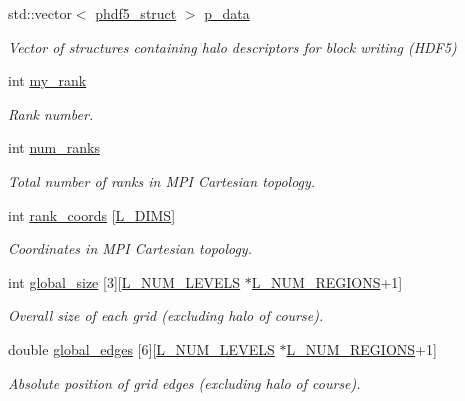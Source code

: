 \begin{DoxyCompactItemize}
std\+::vector$<$ \hyperlink{struct_mpi_manager_1_1phdf5__struct}{phdf5\+\_\+struct} $>$ \hyperlink{class_mpi_manager_a03972530e718d5b0a7f119e9c6132179}{p\+\_\+data}
\begin{DoxyCompactList}\small\item\em Vector of structures containing halo descriptors for block writing (H\+D\+F5) \end{DoxyCompactList}\item 
int \hyperlink{class_mpi_manager_a8329212abc23e5fa3e32e961b7823b5b}{my\+\_\+rank}
\begin{DoxyCompactList}\small\item\em Rank number. \end{DoxyCompactList}\item 
int \hyperlink{class_mpi_manager_af5156a5e4519f43230b6b84792464e48}{num\+\_\+ranks}
\begin{DoxyCompactList}\small\item\em Total number of ranks in M\+PI Cartesian topology. \end{DoxyCompactList}\item 
int \hyperlink{class_mpi_manager_a54a3ad1d90d1508ebc82f81655d917f8}{rank\+\_\+coords} \mbox{[}\hyperlink{definitions_8h_a31d5945080ee5c34edc32e6f74c724c8}{L\+\_\+\+D\+I\+MS}\mbox{]}
\begin{DoxyCompactList}\small\item\em Coordinates in M\+PI Cartesian topology. \end{DoxyCompactList}\item 
int \hyperlink{class_mpi_manager_a3cdf6e1ce19f22daa9e84bc88bf4382d}{global\+\_\+size} \mbox{[}3\mbox{]}\mbox{[}\hyperlink{definitions_8h_a2ce7c3facc5f789b0e201757516539a5}{L\+\_\+\+N\+U\+M\+\_\+\+L\+E\+V\+E\+LS} $\ast$\hyperlink{definitions_8h_a3efeae83589481193d81da498e7f746a}{L\+\_\+\+N\+U\+M\+\_\+\+R\+E\+G\+I\+O\+NS}+1\mbox{]}
\begin{DoxyCompactList}\small\item\em Overall size of each grid (excluding halo of course). \end{DoxyCompactList}\item 
double \hyperlink{class_mpi_manager_a26f0512e19009451431d6d0ba59bf81a}{global\+\_\+edges} \mbox{[}6\mbox{]}\mbox{[}\hyperlink{definitions_8h_a2ce7c3facc5f789b0e201757516539a5}{L\+\_\+\+N\+U\+M\+\_\+\+L\+E\+V\+E\+LS} $\ast$\hyperlink{definitions_8h_a3efeae83589481193d81da498e7f746a}{L\+\_\+\+N\+U\+M\+\_\+\+R\+E\+G\+I\+O\+NS}+1\mbox{]}
\begin{DoxyCompactList}\small\item\em Absolute position of grid edges (excluding halo of course). \end{DoxyCompactList}\item 

\end{DoxyCompactItemize}
